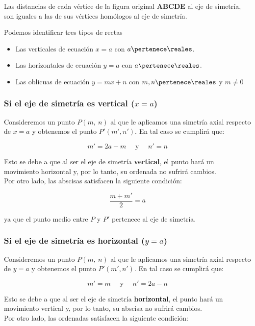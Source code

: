 Las distancias de cada vértice de la figura original \textbf{ABCDE} al eje de simetría, son iguales a las de sus vértices homólogos al eje de simetría.

Podemos identificar tres tipos de rectas
\begin{itemize}
	\item Las verticales de ecuación $x = a$ con $a\pertenece \reales$.
	\item Las horizontales de ecuación $y = a$ con $a\pertenece \reales$.
	\item Las oblicuas de ecuación $y = mx + n$ con $m,n \pertenece \reales$ y $m\neq 0$
\end{itemize}

\subsubsection{Si el eje de simetría es vertical ($x = a$)}
Consideremos un punto $P(m,~n)$ al que le aplicamos una simetría axial respecto de $x = a$ y obtenemos el punto $P'(m', n')$. En tal caso se cumplirá que:

\[m' = 2a - m \quad\text{ y }\quad n' = n\]

Esto se debe a que al ser el eje de simetría \textbf{vertical}, el punto hará un movimiento horizontal y, por lo tanto, su ordenada no sufrirá cambios.\\

Por otro lado, las abscisas satisfacen la siguiente condición:

\[\dfrac{m +m'}{2} = a \]

ya que el punto medio entre $P$ y $P'$ pertenece al eje de simetría.

\subsubsection{Si el eje de simetría es horizontal ($y = a$)}

Consideremos un punto $P(m,~n)$ al que le aplicamos una simetría axial respecto de $y = a$ y obtenemos el punto $P'(m', n')$. En tal caso se cumplirá que:

\[m' =  m \quad\text{ y }\quad n' = 2a - n\]

Esto se debe a que al ser el eje de simetría \textbf{horizontal}, el punto hará un movimiento vertical y, por lo tanto, su abscisa no sufrirá cambios.\\

Por otro lado, las ordenadas satisfacen la siguiente condición:

